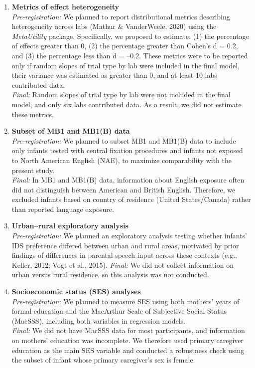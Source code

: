\documentclass[
  english,
  ,man,floatsintext]{apa6}
\begin{document}
\begin{enumerate}
  \emph{Final:} This comparison was not conducted because MB1(B) did not report ICC values.
\item
  \textbf{Metrics of effect heterogeneity}\\
  \emph{Pre-registration:} We planned to report distributional metrics describing heterogeneity across labs (Mathur \& VanderWeele, 2020) using the \emph{MetaUtility} package. Specifically, we proposed to estimate: (1) the percentage of effects greater than 0, (2) the percentage greater than Cohen's d = 0.2, and (3) the percentage less than d = --0.2. These metrics were to be reported only if random slopes of trial type by lab were included in the final model, their variance was estimated as greater than 0, and at least 10 labs contributed data.\\
  \emph{Final:} Random slopes of trial type by lab were not included in the final model, and only six labs contributed data. As a result, we did not estimate these metrics.
\item
  \textbf{Subset of MB1 and MB1(B) data}\\
  \emph{Pre-registration:} We planned to subset MB1 and MB1(B) data to include only infants tested with central fixation procedures and infants not exposed to North American English (NAE), to maximize comparability with the present study.\\
  \emph{Final:} In MB1 and MB1(B) data, information about English exposure often did not distinguish between American and British English. Therefore, we excluded infants based on country of residence (United States/Canada) rather than reported language exposure.
\item
  \textbf{Urban--rural exploratory analysis}\\
  \emph{Pre-registration:} We planned an exploratory analysis testing whether infants' IDS preference differed between urban and rural areas, motivated by prior findings of differences in parental speech input across these contexts (e.g., Keller, 2012; Vogt et al., 2015).
  \emph{Final:} We did not collect information on urban versus rural residence, so this analysis was not conducted.
\item
  \textbf{Socioeconomic status (SES) analyses}\\
  \emph{Pre-registration:} We planned to measure SES using both mothers' years of formal education and the MacArthur Scale of Subjective Social Status (MacSSS), including both variables in regression models.\\
  \emph{Final:} We did not have MacSSS data for most participants, and information on mothers' education was incomplete. We therefore used primary caregiver education as the main SES variable and conducted a robustness check using the subset of infant whose primary caregiver's sex is female.
\end{enumerate}
\end{document}
